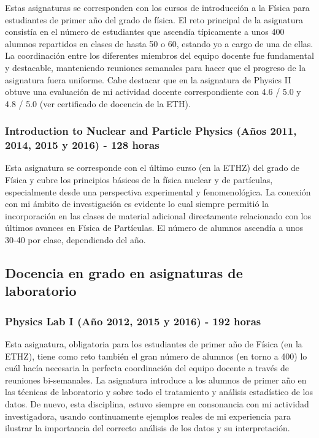 Estas asignaturas se corresponden con los cursos de introducción a la Física para estudiantes de primer año del grado de física. El reto principal de la asignatura consistía en el número de estudiantes que ascendía típicamente a unos 400 alumnos repartidos en clases de hasta 50 o 60, estando yo a cargo de una de ellas. La coordinación entre los diferentes miembros del equipo docente fue fundamental y destacable, manteniendo reuniones semanales para hacer que el progreso de la asignatura fuera uniforme. Cabe destacar que en la asignatura de Physics II obtuve una evaluación de mi actividad docente correspondiente con 4.6 / 5.0 y 4.8 / 5.0 (ver certificado de docencia de la ETH).

\subsubsection{Introduction to Nuclear and Particle Physics (Años 2011, 2014, 2015 y 2016) - 128 horas}

Esta asignatura se corresponde con el último curso (en la ETHZ) del grado de Física y cubre los principios básicos de la física nuclear y de partículas, especialmente desde una perspectiva experimental y fenomenológica. La conexión con mi ámbito de investigación es evidente lo cual siempre permitió la incorporación en las clases de material adicional directamente relacionado con los últimos avances en Física de Partículas. El número de alumnos ascendía a unos 30-40 por clase, dependiendo del año. 

\subsection{Docencia en grado en asignaturas de laboratorio}

\subsubsection{Physics Lab I (Año 2012, 2015 y 2016) - 192 horas}

Esta asignatura, obligatoria para los estudiantes de primer año de Física (en la ETHZ), tiene como reto también el gran número de alumnos (en torno a 400) lo cuál hacía necesaria la perfecta coordinación del equipo docente a través de reuniones bi-semanales. La asignatura introduce a los alumnos de primer año en las técnicas de laboratorio y sobre todo el tratamiento y análisis estadístico de los datos. De nuevo, esta disciplina, estuvo siempre en consonancia con mi actividad investigadora, usando continuamente ejemplos reales de mi experiencia para ilustrar la importancia del correcto análisis de los datos y su interpretación.

